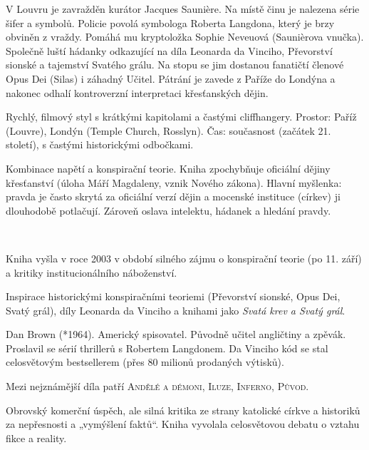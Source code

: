 \documentclass[FGBook.tex]{subfiles}
\begin{document}
\noindent V Louvru je zavražděn kurátor Jacques Saunière. Na místě činu je nalezena série šifer a symbolů. Policie povolá symbologa Roberta Langdona, který je brzy obviněn z vraždy. Pomáhá mu kryptoložka Sophie Neveuová (Saunièrova vnučka). Společně luští hádanky odkazující na díla Leonarda da Vinciho, Převorství sionské a tajemství Svatého grálu. Na stopu se jim dostanou fanatičtí členové Opus Dei (Silas) i záhadný Učitel. Pátrání je zavede z Paříže do Londýna a nakonec odhalí kontroverzní interpretaci křesťanských dějin.

\noindent Rychlý, filmový styl s krátkými kapitolami a častými cliffhangery. Prostor: Paříž (Louvre), Londýn (Temple Church, Rosslyn). Čas: současnost (začátek 21. století), s častými historickými odbočkami.

\noindent Kombinace napětí a konspirační teorie. Kniha zpochybňuje oficiální dějiny křesťanství (úloha Máří Magdaleny, vznik Nového zákona). Hlavní myšlenka: pravda je často skrytá za oficiální verzí dějin a mocenské instituce (církev) ji dlouhodobě potlačují. Zároveň oslava intelektu, hádanek a hledání pravdy.

\vspace*{2em}\\

\noindent Kniha vyšla v roce 2003 v období silného zájmu o konspirační teorie (po 11. září) a kritiky institucionálního náboženství.

\noindent Inspirace historickými konspiračními teoriemi (Převorství sionské, Opus Dei, Svatý grál), díly Leonarda da Vinciho a knihami jako \textit{Svatá krev a Svatý grál}.

\noindent Dan Brown (*1964). Americký spisovatel. Původně učitel angličtiny a zpěvák. Proslavil se sérií thrillerů s Robertem Langdonem. Da Vinciho kód se stal celosvětovým bestsellerem (přes 80 milionů prodaných výtisků).

\noindent Mezi nejznámější díla patří \textsc{Andělé a démoni}, \textsc{Iluze}, \textsc{Inferno}, \textsc{Původ}.

\noindent Obrovský komerční úspěch, ale silná kritika ze strany katolické církve a historiků za nepřesnosti a „vymýšlení faktů“. Kniha vyvolala celosvětovou debatu o vztahu fikce a reality.
\end{document}
